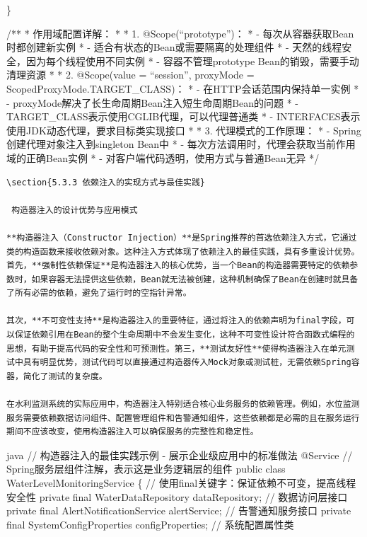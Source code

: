 \}

/** * 作用域配置详解： * * 1. @Scope(``prototype'')： * - 每次从容器获取Bean时都创建新实例 * - 适合有状态的Bean或需要隔离的处理组件 * - 天然的线程安全，因为每个线程使用不同实例 * - 容器不管理prototype Bean的销毁，需要手动清理资源 * * 2. @Scope(value = ``session'', proxyMode = ScopedProxyMode.TARGET\_CLASS)： * - 在HTTP会话范围内保持单一实例 * - proxyMode解决了长生命周期Bean注入短生命周期Bean的问题 * - TARGET\_CLASS表示使用CGLIB代理，可以代理普通类 * - INTERFACES表示使用JDK动态代理，要求目标类实现接口 * * 3. 代理模式的工作原理： * - Spring创建代理对象注入到singleton Bean中 * - 每次方法调用时，代理会获取当前作用域的正确Bean实例 * - 对客户端代码透明，使用方式与普通Bean无异 */

\begin{lstlisting}
\section{5.3.3 依赖注入的实现方式与最佳实践}

 构造器注入的设计优势与应用模式

**构造器注入（Constructor Injection）**是Spring推荐的首选依赖注入方式，它通过类的构造函数来接收依赖对象。这种注入方式体现了依赖注入的最佳实践，具有多重设计优势。首先，**强制性依赖保证**是构造器注入的核心优势，当一个Bean的构造器需要特定的依赖参数时，如果容器无法提供这些依赖，Bean就无法被创建，这种机制确保了Bean在创建时就具备了所有必需的依赖，避免了运行时的空指针异常。

其次，**不可变性支持**是构造器注入的重要特征，通过将注入的依赖声明为final字段，可以保证依赖引用在Bean的整个生命周期中不会发生变化，这种不可变性设计符合函数式编程的思想，有助于提高代码的安全性和可预测性。第三，**测试友好性**使得构造器注入在单元测试中具有明显优势，测试代码可以直接通过构造器传入Mock对象或测试桩，无需依赖Spring容器，简化了测试的复杂度。

在水利监测系统的实际应用中，构造器注入特别适合核心业务服务的依赖管理。例如，水位监测服务需要依赖数据访问组件、配置管理组件和告警通知组件，这些依赖都是必需的且在服务运行期间不应该改变，使用构造器注入可以确保服务的完整性和稳定性。
\end{lstlisting}

java // 构造器注入的最佳实践示例 - 展示企业级应用中的标准做法 @Service // Spring服务层组件注解，表示这是业务逻辑层的组件 public class WaterLevelMonitoringService \{ // 使用final关键字：保证依赖不可变，提高线程安全性 private final WaterDataRepository dataRepository; // 数据访问层接口 private final AlertNotificationService alertService; // 告警通知服务接口 private final SystemConfigProperties configProperties; // 系统配置属性类

